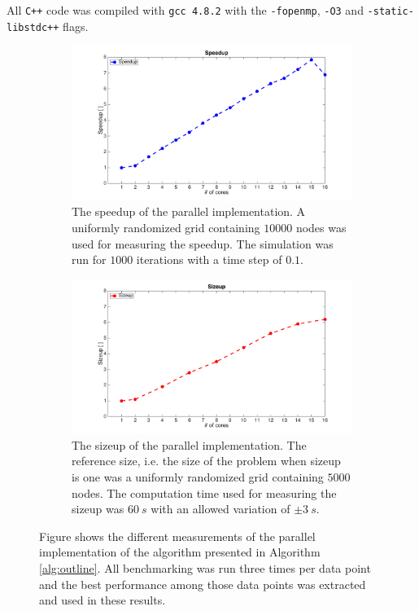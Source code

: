 \noindent All \texttt{C++} code was compiled with \texttt{gcc 4.8.2} with the \texttt{-fopenmp}, \texttt{-O3} and  \texttt{-static-libstdc++} flags.

\begin{figure}
\centering
\begin{subfigure}[b]{1\textwidth}
\includegraphics[width=\textwidth, height=0.5\textwidth]{img/speedup.png}
\caption{The speedup of the parallel implementation. A uniformly randomized grid containing $10000$ nodes was used for measuring the speedup. The simulation was run for $1000$ iterations with a time step of $0.1$.}
\end{subfigure}

\begin{subfigure}[b]{1\textwidth}
\includegraphics[width=\textwidth, height=0.5\textwidth]{img/sizeup.png}
\caption{The sizeup of the parallel implementation. The reference size, i.e. the size of the problem when sizeup is one was a uniformly randomized grid containing $5000$ nodes. The computation time used for measuring the sizeup was $60~s$ with an allowed variation of $\pm 3~s$. }
\end{subfigure}
\caption{Figure shows the different measurements of the parallel implementation of the algorithm presented in Algorithm \ref{alg:outline}. All benchmarking was run three times per data point and the best performance among those data points was extracted and used in these results.}
\label{fig:speed_size}
\end{figure}

